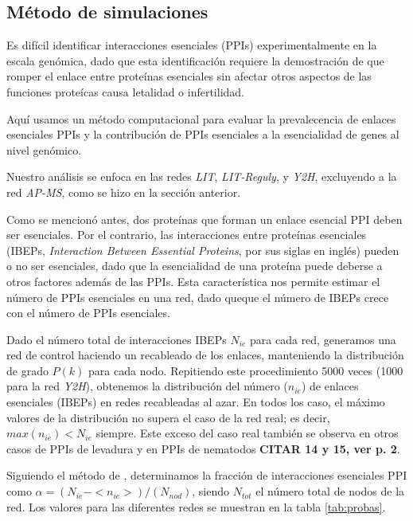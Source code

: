 
\subsection{M\'etodo de simulaciones}
\label{sec:simulacion}

Es dif\'icil identificar interacciones esenciales (PPIs) experimentalmente en la escala gen\'omica, dado que esta identificaci\'on requiere la demostraci\'on de que romper el enlace entre prote\'inas esenciales sin afectar otros aspectos de las funciones prote\'icas causa letalidad o infertilidad.

Aqu\'i usamos un m\'etodo computacional para evaluar la prevalecencia de enlaces esenciales PPIs y la contribuci\'on de PPIs esenciales a la esencialidad de genes al nivel gen\'omico.

Nuestro an\'alisis se enfoca en las redes {\it LIT}, {\it LIT-Reguly}, y {\it Y2H}, excluyendo a la red {\it AP-MS}, como se hizo en la secci\'on anterior.

Como se mencion\'o antes, dos prote\'inas que forman un enlace esencial PPI deben ser esenciales.
Por el contrario, las interacciones entre prote\'inas esenciales (IBEPs, {\it Interaction Between Essential Proteins}, por sus siglas en ingl\'es) pueden o no ser esenciales, dado que la esencialidad de una prote\'ina puede deberse a otros factores adem\'as de las PPIs.
Esta caracter\'istica nos permite estimar el n\'umero de PPIs esenciales en una red, dado queque el n\'umero de IBEPs crece con el n\'umero de PPIs esenciales.

Dado el n\'umero total de interacciones IBEPs $N_{ie}$ para cada red, generamos una red de control haciendo un recableado de los enlaces, manteniendo la distribuci\'on de grado $P(k)$ para cada nodo.
Repitiendo este procedimiento 5000 veces (1000 para la red {\it Y2H}), obtenemos la distribuci\'on del n\'umero ($n_{ie}$) de enlaces esenciales (IBEPs) en redes recableadas al azar.
En todos los caso, el m\'aximo valores de la distribuci\'on no supera el caso de la red real; es decir, $max(n_{ie}) < N_{ie}$ siempre.
Este exceso del caso real tambi\'en se observa en otros casos de PPIs de levadura y en PPIs de nematodos {\bf CITAR 14 y 15, ver p. 2}.

Siguiendo el m\'etodo de \cite{he2006}, determinamos la fracci\'on de interacciones esenciales PPI como $\alpha = (N_{ie} - <n_{ie}>)/(N_{nod})$, siendo $N_{tot}$ el n\'umero total de nodos de la red.
Los valores para las diferentes redes se muestran en la tabla \ref{tab:probas}.



